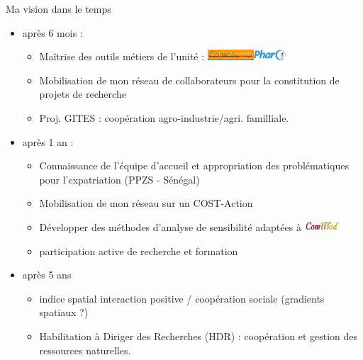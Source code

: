 \documentclass[newPxFont]{beamer}
\begin{document}

\begin{frame}{Ma vision dans le temps}
	\vspace{-2em}
	\small
	\begin{itemize}
		\vspace{-0.5em}
		\item après 6 mois :
		\vspace{-0.5em}
			\begin{itemize}
				\item Maîtrise des outils métiers de l'unité : \includegraphics[height=0.4cm]{img/logo_cormas}\includegraphics[height=0.4cm]{img/logo_pharo}
				\item Mobilisation de mon réseau de collaborateurs pour la constitution de projets de recherche
        \item Proj. GITES : \alert{\color{sthlmBlue}coopération} agro-industrie/agri. familliale.
			\end{itemize}
		\vspace{-0.5em}
		\item après 1 an :
		\vspace{-0.5em}
			\begin{itemize}
				\item Connaissance de l'équipe d'accueil et appropriation des problématiques pour l'expatriation (PPZS - Sénégal)
				\item Mobilisation de mon réseau sur un COST-Action
        \item Développer des méthodes d'analyse de sensibilité adaptées à \includegraphics[width=1.3cm]{img/logo_commod}
        \item participation active de recherche et formation
			\end{itemize}
		\vspace{-0.5em}
		\item après 5 ans
		\vspace{-0.5em}
			\begin{itemize}
				\item indice spatial \alert{\color{sthlmBlue}interaction positive} / \alert{\color{sthlmBlue}coopération sociale} (gradients spatiaux ?)
        \item Habilitation à Diriger des Recherches (HDR) : coopération et gestion des ressources naturelles.
			\end{itemize}
	\end{itemize}
	\normalsize
\end{frame}
\end{document}
